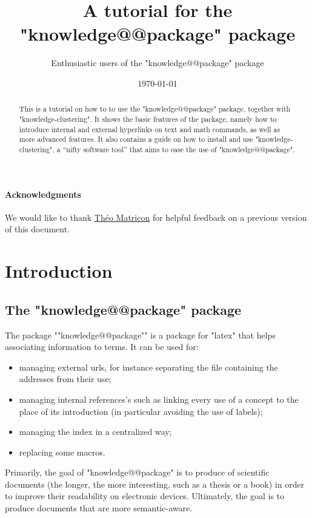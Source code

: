 \documentclass{article}
\title{A tutorial for the "knowledge@@package" package}
\author{Enthusiastic users of the "knowledge@@package" package}
\date{\today}
\begin{document}
\maketitle

\begin{abstract}
    This is a tutorial on how to to use the 
    "knowledge@@package" package, together with "knowledge-clustering".
    It shows the basic features of the package, namely how 
    to introduce internal and external hyperlinks on text and math commands,
    as well as more advanced features.
    It also contains a guide on how to install and use "knowledge-clustering", 
    a ``nifty software tool'' that aims to ease the use of "knowledge@@package".
\end{abstract}

\tableofcontents

\paragraph{Acknowledgments} We would like to thank
\href{http://www.matricon.ninja/}{Théo Matricon} for helpful feedback
on a previous version of this document.


\section{Introduction}

\subsection{The "knowledge@@package" package}

The package \AP""knowledge@@package"" is a package for "latex" that helps associating 
information to terms. It can be used for:
\begin{itemize}
    \item managing external urls, for instance separating the file containing   
        the addresses from their use;
    \item managing internal references's such as linking every use of a concept 
        to the place of its introduction
        (in particular avoiding the use of labels);
    \item managing the index in a centralized way;
    \item replacing some macros.
\end{itemize}

Primarily, the goal of "knowledge@@package" is to produce of scientific documents (the longer, the more interesting, such as a thesis or a book) in order to improve their readability on electronic devices. Ultimately, the goal is to produce documents that are more semantic-aware.
\end{document}

